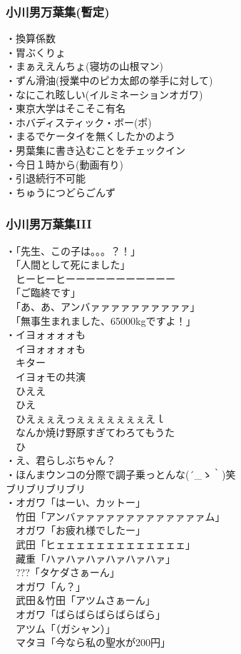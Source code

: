 \documentclass[12pt]{jsarticle}
\begin{document}
\subsubsection{小川男万葉集(暫定)}
・換算係数 \\
・胃ぶくりょ\\ 
・まぁええんちょ(寝坊の山根マン)\\
・ずん滑油(授業中のピカ太郎の挙手に対して)\\
・なにこれ眩しい(イルミネーションオガワ) \\
・東京大学はそこそこ有名\\
・ホバディスティック・ボー(ポ)\\
・まるでケータイを無くしたかのよう\\
・男葉集に書き込むことをチェックイン\\
・今日１時から(動画有り)\\
・引退続行不可能\\
・ちゅうにつどらごんず\\

\newpage
\subsubsection{小川男万葉集III}
・「先生、この子は。。。？！」\\
　「人間として死にました」\\
　ヒーヒーヒーーーーーーーーーーー\\
　「ご臨終です」\\
　「あ、あ、アンバァァァァァァァァァァ」\\
　「無事生まれました、65000kgですよ！」\\
・イヨォォォォも\\
　イヨォォォォも\\
　キター\\
　イヨォモの共演\\
　ひええ\\
　ひえ\\
　ひえぇぇえっぇぇぇぇぇぇぇえｌ\\
　なんか焼け野原すぎてわろてもうた\\
　ひ\\
・え、君らしぶちゃん？\\
・ほんまウンコの分際で調子乗っとんな{\sf (´\_ゝ｀)}笑\\
    ブリブリブリブリ\\
・オガワ「はーい、カットー」\\
　竹田「アンバァァァァァァァァァァァァァム」\\
　オガワ「お疲れ様でしたー」\\
　武田「ヒェェェェェェェェェェェェェ」\\
　藏重「ハァハァハァハァハァハァ」\\
　???「タケダさぁーん」\\
　オガワ「ん？」\\
　武田＆竹田「アツムさぁーん」\\
　オガワ「ばらばらばらばらばら」\\
　アツム「（ガシャン）」\\
　マタヨ「今なら私の聖水が200円」\\
\end{document}

